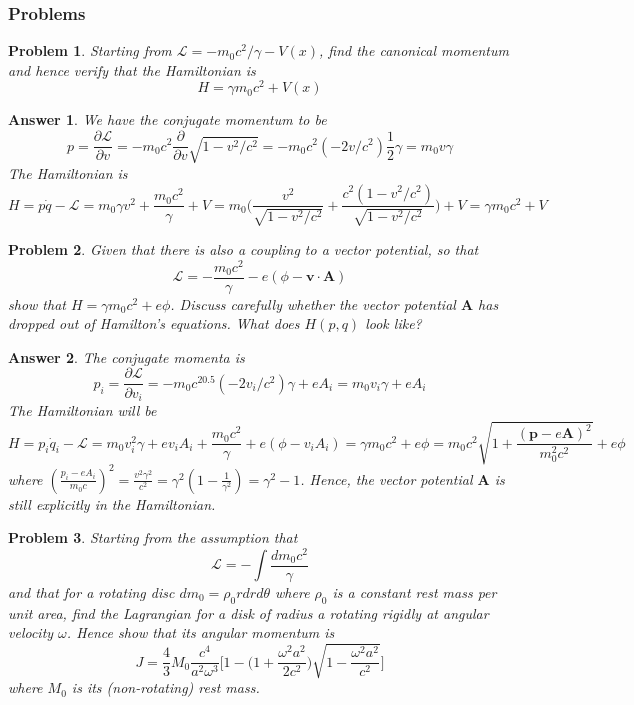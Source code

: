 \documentclass[a4paper]{article}
\newtheorem{ans}{Answer}[section]
\theoremstyle{new}
\newtheorem{qns}{Problem}[section]
\begin{document}
\subsubsection{Problems}
\begin{qns}
Starting from $\mathcal{L}=-m_0c^2/\gamma -V(x)$, find the canonical momentum and hence verify that the Hamiltonian is
$$H=\gamma m_0c^2+V(x)$$
\end{qns}
\begin{ans}
We have the conjugate momentum to be 
$$p=\frac{\partial\mathcal{L}}{\partial v}=-m_0c^2\frac{\partial}{\partial v}\sqrt{1-v^2/c^2}=-m_0c^2(-2v/c^2)\frac{1}{2}\gamma=m_0v\gamma$$
The Hamiltonian is 
$$H=p\dot{q}-\mathcal{L}=m_0\gamma v^2+\frac{m_0c^2}{\gamma}+V=m_0\bigg(\frac{v^2}{\sqrt{1-v^2/c^2}}+\frac{c^2(1-v^2/c^2)}{\sqrt{1-v^2/c^2}}\bigg)+V=\gamma m_0c^2+V$$
\end{ans}
\begin{qns}
Given that there is also a coupling to a vector potential, so that
$$\mathcal{L}=-\frac{m_0c^2}{\gamma}-e(\phi-\mathbf{v}\cdot\mathbf{A})$$
show that $H=\gamma m_0c^2+e\phi$. Discuss carefully whether the vector potential $\mathbf{A}$ has dropped out of Hamilton’s equations. What does $H(p,q)$ look like?
\end{qns}
\begin{ans}
The conjugate momenta is
$$p_i=\frac{\partial\mathcal{L}}{\partial v_i}=-m_0c^20.5(-2v_i/c^2)\gamma+eA_i=m_0v_i\gamma+eA_i$$
The Hamiltonian will be
$$H=p_i\dot{q}_i-\mathcal{L}=m_0v_i^2\gamma+ev_iA_i+\frac{m_0c^2}{\gamma}+e(\phi-v_iA_i)=\gamma m_0c^2+e\phi=m_0c^2\sqrt{1+\frac{(\mathbf{p}-e\mathbf{A})^2}{m_0^2c^2}}+e\phi$$
where $(\frac{p_i-eA_i}{m_0c})^2=\frac{v^2\gamma^2}{c^2}=\gamma^2(1-\frac{1}{\gamma^2})=\gamma^2-1$. Hence, the vector potential $\mathbf{A}$ is still explicitly in the Hamiltonian.
\end{ans}
\newpage
\begin{qns}
Starting from the assumption that
$$\mathcal{L}=-\int\frac{dm_0c^2}{\gamma}$$
and that for a rotating disc $dm_0=\rho_0rdrd\theta$
where $\rho_0$ is a constant rest mass per unit area, find the Lagrangian for a disk of radius a rotating rigidly at angular velocity $\omega$. Hence show that its angular momentum is
$$J=\frac{4}{3}M_0\frac{c^4}{a^2\omega^3}\bigg[1-\bigg(1+\frac{\omega^2a^2}{2c^2}\bigg)\sqrt{1-\frac{\omega^2a^2}{c^2}}\bigg]$$
where $M_0$ is its (non-rotating) rest mass.
\end{qns}
\end{document}
